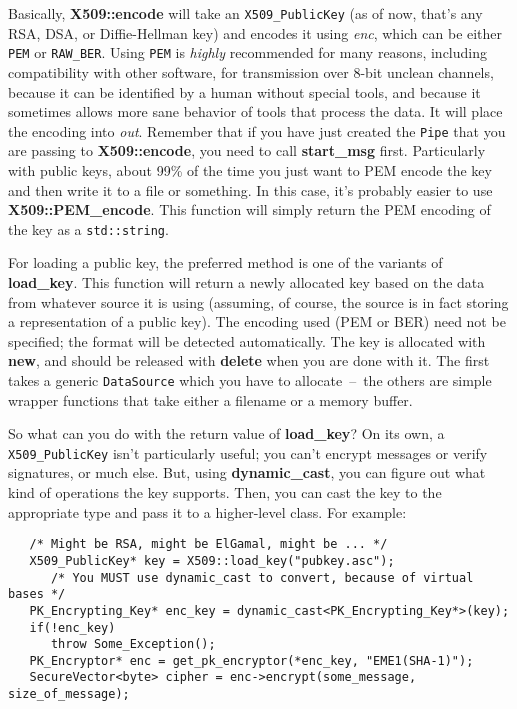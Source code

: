 \documentclass{article}
\newcommand{\function}[1]{\textbf{#1}}
\newcommand{\type}[1]{\texttt{#1}}
\renewcommand{\arg}[1]{\textsl{#1}}
\begin{document}
Basically, \function{X509::encode} will take an \type{X509\_PublicKey}
(as of now, that's any RSA, DSA, or Diffie-Hellman key) and encodes it
using \arg{enc}, which can be either \type{PEM} or
\type{RAW\_BER}. Using \type{PEM} is \emph{highly} recommended for
many reasons, including compatibility with other software, for
transmission over 8-bit unclean channels, because it can be identified
by a human without special tools, and because it sometimes allows more
sane behavior of tools that process the data. It will place the
encoding into \arg{out}. Remember that if you have just created the
\type{Pipe} that you are passing to \function{X509::encode}, you need
to call \function{start\_msg} first. Particularly with public keys,
about 99\% of the time you just want to PEM encode the key and then
write it to a file or something. In this case, it's probably easier to
use \function{X509::PEM\_encode}. This function will simply return the
PEM encoding of the key as a \type{std::string}.

For loading a public key, the preferred method is one of the variants
of \function{load\_key}. This function will return a newly allocated
key based on the data from whatever source it is using (assuming, of
course, the source is in fact storing a representation of a public
key). The encoding used (PEM or BER) need not be specified; the format
will be detected automatically. The key is allocated with
\function{new}, and should be released with \function{delete} when you
are done with it. The first takes a generic \type{DataSource} which
you have to allocate~--~the others are simple wrapper functions that
take either a filename or a memory buffer.

So what can you do with the return value of \function{load\_key}? On
its own, a \type{X509\_PublicKey} isn't particularly useful; you can't
encrypt messages or verify signatures, or much else. But, using
\function{dynamic\_cast}, you can figure out what kind of operations
the key supports. Then, you can cast the key to the appropriate type
and pass it to a higher-level class. For example:

\begin{verbatim}
   /* Might be RSA, might be ElGamal, might be ... */
   X509_PublicKey* key = X509::load_key("pubkey.asc");
      /* You MUST use dynamic_cast to convert, because of virtual bases */
   PK_Encrypting_Key* enc_key = dynamic_cast<PK_Encrypting_Key*>(key);
   if(!enc_key)
      throw Some_Exception();
   PK_Encryptor* enc = get_pk_encryptor(*enc_key, "EME1(SHA-1)");
   SecureVector<byte> cipher = enc->encrypt(some_message, size_of_message);
\end{verbatim}
\end{document}
